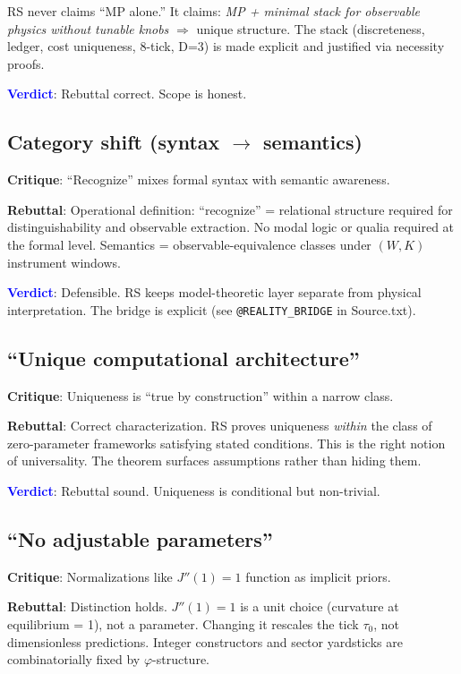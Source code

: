 \documentclass[11pt]{article}
\begin{document}
RS never claims ``MP alone.'' It claims: \emph{MP + minimal stack for observable physics without tunable knobs} $\Rightarrow$ unique structure. The stack (discreteness, ledger, cost uniqueness, 8-tick, D=3) is made explicit and justified via necessity proofs.

\noindent\textcolor{blue}{\textbf{Verdict}}: Rebuttal correct. Scope is honest.

\subsection{Category shift (syntax $\to$ semantics)}

\textbf{Critique}: ``Recognize'' mixes formal syntax with semantic awareness.

\textbf{Rebuttal}: Operational definition: ``recognize'' = relational structure required for distinguishability and observable extraction. No modal logic or qualia required at the formal level. Semantics = observable-equivalence classes under $(W,K)$ instrument windows.

\noindent\textcolor{blue}{\textbf{Verdict}}: Defensible. RS keeps model-theoretic layer separate from physical interpretation. The bridge is explicit (see \texttt{@REALITY\_BRIDGE} in Source.txt).

\subsection{``Unique computational architecture''}

\textbf{Critique}: Uniqueness is ``true by construction'' within a narrow class.

\textbf{Rebuttal}: Correct characterization. RS proves uniqueness \emph{within} the class of zero-parameter frameworks satisfying stated conditions. This is the right notion of universality. The theorem surfaces assumptions rather than hiding them.

\noindent\textcolor{blue}{\textbf{Verdict}}: Rebuttal sound. Uniqueness is conditional but non-trivial.

\subsection{``No adjustable parameters''}

\textbf{Critique}: Normalizations like $J''(1)=1$ function as implicit priors.

\textbf{Rebuttal}: Distinction holds. $J''(1)=1$ is a unit choice (curvature at equilibrium = 1), not a parameter. Changing it rescales the tick $\tau_0$, not dimensionless predictions. Integer constructors and sector yardsticks are combinatorially fixed by $\varphi$-structure.
\end{document}
